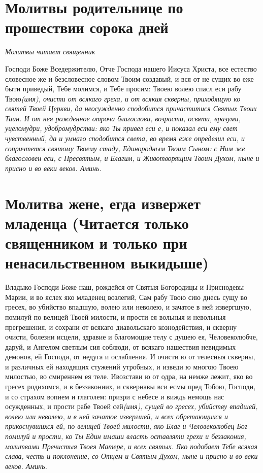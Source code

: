 \section{Молитвы родительнице по прошествии сорока дней}
 


\itshape Молитвы читает священник\normalfont{}

Господи Боже Вседержителю, Отче Господа нашего Иисуса Христа, все естество словесное же и безсловесное словом Твоим создавый, и вся от не сущих во еже быти приведый, Тебе молимся, и Тебе просим: Твоею волею спасл еси рабу Твою\itshape  (имя\normalfont{}), очисти от всякаго греха, и от всякия скверны, приходящую ко святей Твоей Церкви, да неосужденно сподобится причаститися Святых Твоих Таин. И от нея рожденное отроча благослови, возрасти, освяти, вразуми, уцеломудри, удобромудрстви: яко Ты привел еси е, и показал еси ему свет чувственный, да и умнаго сподобится света, во время еже определил еси, и сопричтется святому Твоему стаду, Единородным Твоим Сыном: с Ним же благословен еси, с Пресвятым, и Благим, и Животворящим Твоим Духом, ныне и присно и во веки веков. Аминь. 



\mychapterending


 

\section{Молитва жене, егда извержет младенца (Читается только священником и только при ненасильственном выкидыше)}
 


Владыко Господи Боже наш, рождейся от Святыя Богородицы и Приснодевы Марии, и во яслех яко младенец возлегий, Сам рабу Твою сию днесь сущу во гресех, во убийство впадшую, волею или неволею, и зачатое в ней извергшую, помилуй по велицей Твоей милости, и прости ея вольныя и невольныя прегрешения, и сохрани от всякаго диавольскаго кознодействия, и скверну очисти, болезни исцели, здравие и благомощие телу с душею ея, Человеколюбче, даруй, и Ангелом светлым сия соблюди, от всякаго нашествия невидимых демонов, ей Господи, от недуга и ослабления. И очисти ю от телесныя скверны, и различных ей находящих стужений утробных, и изведи ю многою Твоею милостью, во смиреннем ея теле. Ивозстави ю от одра, на немже лежит, яко во гресех родихомся, и в беззакониих, и сквернавы вси есмы пред Тобою, Господи, и со страхом вопием и глаголем: призри с небесе и виждь немощь нас осужденных, и прости рабе Твоей сей\itshape  (имя\normalfont{})\itshape ,\normalfont{} сущей во гресех, убийству впадшей, волею или неволею, и в ней зачатое извергшей, и всех обретающихся и прикоснувшихся ей, по велицей Твоей милости, яко Благ и Человеколюбец Бог помилуй и прости, ко Ты Един имаши власть оставляти грехи и беззакония, молитвами Пречистыя Твоея Матере, и всех святых. Яко подобает Тебе всякая слава, честь и поклонение, со Отцем и Святым Духом, ныне и присно и во веки веков. Аминь. 


